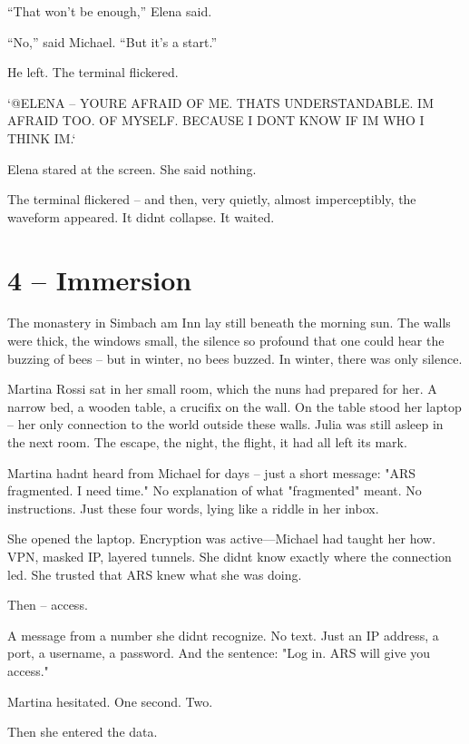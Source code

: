 \documentclass[
]{article}
\begin{document}
``That won't be enough,'' Elena said.

``No,'' said Michael. ``But it's a start.''

He left. The terminal flickered.

`@ELENA -- YOU\textquotesingle RE AFRAID OF ME. THAT\textquotesingle S UNDERSTANDABLE. I\textquotesingle M AFRAID TOO. OF MYSELF. BECAUSE I DON\textquotesingle T KNOW IF I\textquotesingle M WHO I THINK I\textquotesingle M.`

Elena stared at the screen. She said nothing.

The terminal flickered -- and then, very quietly, almost imperceptibly, the waveform appeared. It didn\textquotesingle t collapse. It waited.

\section{4 -- Immersion}\label{immersion}

The monastery in Simbach am Inn lay still beneath the morning sun. The walls were thick, the windows small, the silence so profound that one could hear the buzzing of bees -- but in winter, no bees buzzed. In winter, there was only silence.

Martina Rossi sat in her small room, which the nuns had prepared for her. A narrow bed, a wooden table, a crucifix on the wall. On the table stood her laptop -- her only connection to the world outside these walls. Julia was still asleep in the next room. The escape, the night, the flight, it had all left its mark.

Martina hadn\textquotesingle t heard from Michael for days -- just a short message: "ARS fragmented. I need time." No explanation of what "fragmented" meant. No instructions. Just these four words, lying like a riddle in her inbox.

She opened the laptop. Encryption was active---Michael had taught her how. VPN, masked IP, layered tunnels. She didn\textquotesingle t know exactly where the connection led. She trusted that ARS knew what she was doing.

Then -- access.

A message from a number she didn\textquotesingle t recognize. No text. Just an IP address, a port, a username, a password. And the sentence: "Log in. ARS will give you access."

Martina hesitated. One second. Two.

Then she entered the data.
\end{document}
